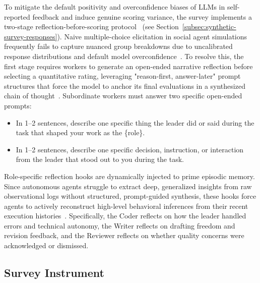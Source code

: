 To mitigate the default positivity and overconfidence biases of \acp{LLM} in self-reported feedback and induce genuine scoring variance, the survey implements a two-stage reflection-before-scoring protocol~\cite{dominguezolmedo2024questioningsurveyresponseslarge, muralidharan2025lessonshumanteamsapplied} (see Section~\ref{subsec:synthetic-survey-responses}).
Naive multiple-choice elicitation in social agent simulations frequently fails to capture nuanced group breakdowns due to uncalibrated response distributions and default model overconfidence~\cite{dominguezolmedo2024questioningsurveyresponseslarge, muralidharan2025lessonshumanteamsapplied}. 
To resolve this, the first stage requires workers to generate an open-ended narrative reflection before selecting a quantitative rating, leveraging "reason-first, answer-later" prompt structures that force the model to anchor its final evaluations in a synthesized chain of thought~\cite{wei2023chainofthoughtpromptingelicitsreasoning}.
Subordinate workers must answer two specific open-ended prompts:
\begin{itemize}
    \item In 1--2 sentences, describe one specific thing the leader did or said during the task that shaped your work as the \{role\}.
    \item In 1--2 sentences, describe one specific decision, instruction, or interaction from the leader that stood out to you during the task.
\end{itemize}
Role-specific reflection hooks are dynamically injected to prime episodic memory. 
Since autonomous agents struggle to extract deep, generalized insights from raw observational logs without structured, prompt-guided synthesis, these hooks force agents to actively reconstruct high-level behavioral inferences from their recent execution histories~\cite{park2023generativeagentsinteractivesimulacra}.
Specifically, the Coder reflects on how the leader handled errors and technical autonomy, 
the Writer reflects on drafting freedom and revision feedback, 
and the Reviewer reflects on whether quality concerns were acknowledged or dismissed.

\subsection{Survey Instrument}
\label{subsec:survey-instrument}

